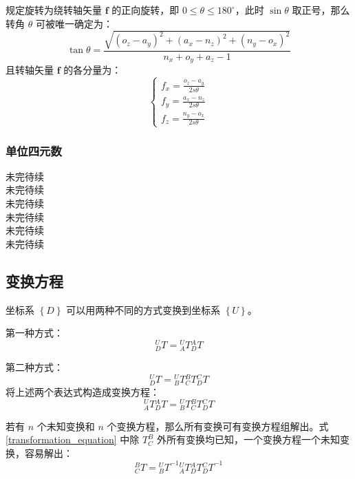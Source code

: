\documentclass[cn,11pt,chinese,blue,bibstyle=ieeetr]{elegantbook}
\begin{document}
规定旋转为绕转轴矢量 $\bm{f}$ 的正向旋转，即 $0 \le \theta \le 180^{\circ}$，此时 $\sin\theta$ 取正号，那么转角 $\theta$ 可被唯一确定为：
\begin{equation}
\tan\theta = \frac{\sqrt{\left(o_z - a_y\right)^2 + \left(a_x - n_z\right)^2 + \left(n_y - o_x\right)^2}}{n_x + o_y + a_z - 1}
\end{equation}
且转轴矢量 $\bm{f}$ 的各分量为：
\begin{equation}
\left\{\begin{array}{c}
f_x = \frac{o_z - a_y}{2s\theta} \\
f_y = \frac{a_x - n_z}{2s\theta} \\
f_z = \frac{n_y - o_x}{2s\theta}
\end{array}
\right.
\end{equation}


\subsubsection{单位四元数}

未完待续 \\
未完待续 \\
未完待续 \\
未完待续 \\
未完待续 \\
未完待续 \\



\subsection{变换方程}

坐标系 $\left\{D\right\}$ 可以用两种不同的方式变换到坐标系 $\left\{U\right\}$。

第一种方式：
$${_D^UT}={_A^UT}{_D^AT}$$

第二种方式：
$${_D^UT}={_B^UT}{_C^BT}{_D^CT}$$
将上述两个表达式构造成变换方程：
\begin{equation}\label{transformation_equation}
{_A^UT}{_D^AT}={_B^UT}{_C^BT}{_D^CT}
\end{equation}

若有 $n$ 个未知变换和 $n$ 个变换方程，那么所有变换可有变换方程组解出。式 \ref{transformation_equation} 中除 $T_C^B$ 外所有变换均已知，一个变换方程一个未知变换，容易解出：
\begin{equation}
_C^BT={_B^UT}^{-1}{ _A^UT}{_D^AT} {_D^CT}^{-1}
\end{equation}
\end{document}
